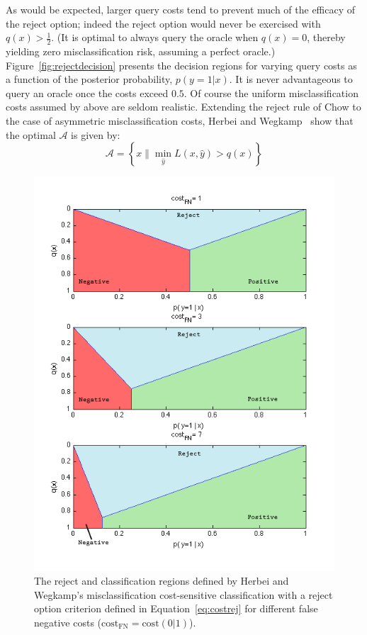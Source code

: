 As would be expected, larger query costs tend to prevent much of the efficacy of the reject option; indeed the reject option would never be exercised with $q(x)>\frac{1}{2}$. (It is optimal to always query the oracle when $q(x) = 0$, thereby yielding zero misclassification risk, assuming a perfect oracle.) Figure~\ref{fig:rejectdecision} presents the decision regions for varying query costs as a function of the posterior probability, $p(y=1|x)$. It is never advantageous to query an oracle once the costs exceed $0.5$.  Of course the uniform misclassification costs assumed by above are seldom realistic. Extending the reject rule of Chow to the case of asymmetric misclassification costs, Herbei and Wegkamp~\cite{herbei:2005} show that the optimal $\mathcal{A}$ is given by: 
\vspace{-0.03in}
\begin{equation}
\mathcal{A} = \left\{ x \| \min_{\hat{y}} L(x, \hat{y}) > q(x) \right\}
\label{eq:costrej}
\end{equation}

\begin{figure}[hbt!]
\begin{center}
\includegraphics[width= .95 \columnwidth]{plots/cost_reject_decision_bounds_fill.png}
\end{center}
\caption{The reject and classification regions defined by Herbei and Wegkamp's misclassification cost-sensitive classification with a reject option criterion defined in Equation~\ref{eq:costrej} for different false negative costs ($\mbox{cost}_{\mbox{FN}} = \mbox{cost}(0|1)$). }
\label{fig:costdecision}
\end{figure}

